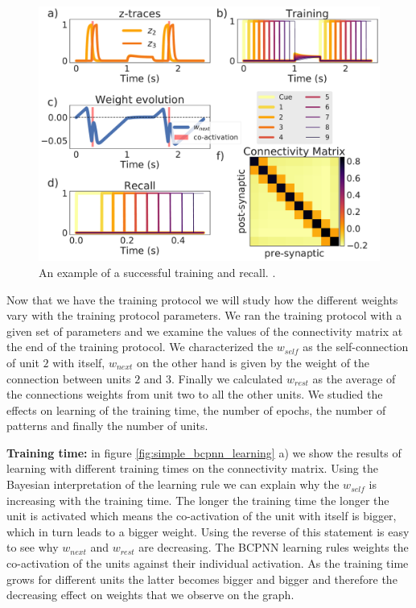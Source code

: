 \documentclass[10pt,a4paper]{article}
\begin{document}
\begin{figure}[H]
\centering
\includegraphics[scale=0.30]{bcpnn_learning_and_recall.pdf}
\caption{An example of a successful training and recall. .}
\label{fig:bcpnn_simple_training_and_recall}

\end{figure}

Now that we have the training protocol we will study how the different weights vary with the training protocol parameters. We ran the training protocol with a given set of parameters and we examine the values of the connectivity matrix at the end of the training protocol. We characterized the $w_{self}$ as the self-connection of unit $2$ with itself, $w_{next}$ on the other hand is given by the weight of the connection between units $2$ and $3$. Finally we calculated $w_{rest}$ as the average of the connections weights from unit two to all the other units. We studied the effects on learning of the training time, the number of epochs, the number of patterns and finally the number of units.

\textbf{Training time:} in figure \ref{fig:simple_bcpnn_learning} a) we show the results of learning with different training times on the connectivity matrix. Using the Bayesian interpretation of the learning rule we can explain why the $w_{self}$ is increasing with the training time. The longer the training time the longer the unit is activated which means the co-activation of the unit with itself is bigger, which in turn leads to a bigger weight. Using the reverse of this statement is easy to see why $w_{next}$ and $w_{rest}$ are decreasing. The BCPNN learning rules weights the co-activation of the units against their individual activation. As the training time grows for different units the latter becomes bigger and bigger and therefore the decreasing effect on weights that we observe on the graph.  
\end{document}
